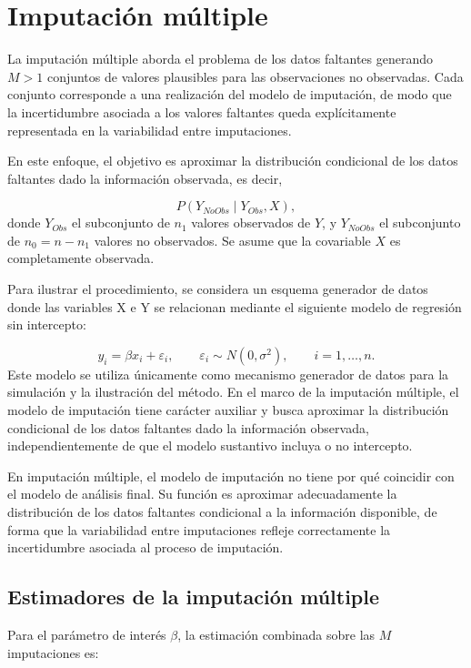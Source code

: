 \documentclass[
  spanish,
  12pt,
]{book}
\begin{document}
\section{Imputación múltiple}\label{sec-im}

La imputación múltiple \citep{rubin1987multiple} aborda el problema de los datos faltantes generando \(M > 1\) conjuntos de valores plausibles para las observaciones no observadas. Cada conjunto corresponde a una realización del modelo de imputación, de modo que la incertidumbre asociada a los valores faltantes queda explícitamente representada en la variabilidad entre imputaciones.

En este enfoque, el objetivo es aproximar la distribución condicional de los datos faltantes dado la información observada, es decir,

\[P(Y_{NoObs} \mid Y_{Obs}, X),\]
donde \(Y_{Obs}\) el subconjunto de \(n_1\) valores observados de \(Y\), y \(Y_{NoObs}\) el subconjunto de \(n_0 = n - n_1\) valores no observados. Se asume que la covariable \(X\) es completamente observada.

Para ilustrar el procedimiento, se considera un esquema generador de datos donde las variables X e Y se relacionan mediante el siguiente modelo de regresión sin intercepto:

\[
y_i = \beta x_i + \varepsilon_i,
\qquad
\varepsilon_i \sim N(0,\sigma^2),
\qquad
i=1,\ldots,n.
\]
Este modelo se utiliza únicamente como mecanismo generador de datos para la simulación y la ilustración del método. En el marco de la imputación múltiple, el modelo de imputación tiene carácter auxiliar y busca aproximar la distribución condicional de los datos faltantes dado la información observada, independientemente de que el modelo sustantivo incluya o no intercepto.

En imputación múltiple, el modelo de imputación no tiene por qué coincidir con el modelo de análisis final. Su función es aproximar adecuadamente la distribución de los datos faltantes condicional a la información disponible, de forma que la variabilidad entre imputaciones refleje correctamente la incertidumbre asociada al proceso de imputación.

\subsection{Estimadores de la imputación múltiple}\label{estimadores-de-la-imputaciuxf3n-muxfaltiple}

Para el parámetro de interés \(\beta\), la estimación combinada sobre las \(M\) imputaciones es:
\end{document}
